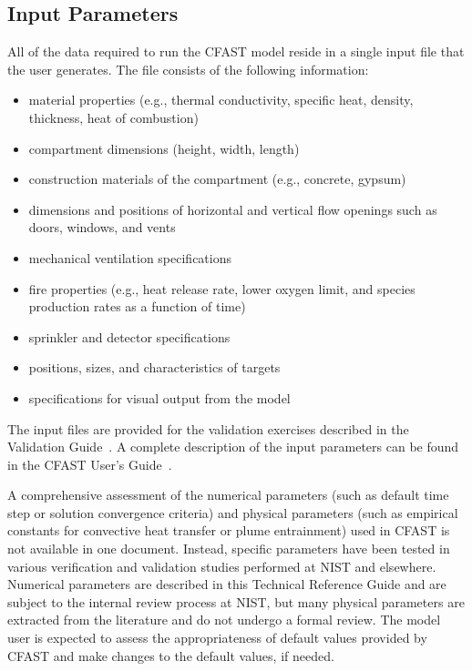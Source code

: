 \documentclass[11pt]{book}
\begin{document}
\subsection{Input Parameters}

All of the data required to run the CFAST model reside in a single input file that the user generates. The file consists of the following information:
\begin{itemize}
\item material properties (e.g., thermal conductivity, specific heat, density, thickness, heat of combustion)
\item compartment dimensions (height, width, length)
\item construction materials of the compartment (e.g., concrete, gypsum)
\item dimensions and positions of horizontal and vertical flow openings such as doors, windows, and vents
\item mechanical ventilation specifications
\item fire properties (e.g., heat release rate, lower oxygen limit, and species production rates as a function of time)
\item sprinkler and detector specifications
\item positions, sizes, and characteristics of targets
\item specifications for visual output from the model
\end{itemize}
The input files are provided for the validation exercises described in the Validation Guide~\cite{CFAST_Valid_Guide_7}. A complete description of the input parameters can be found in the CFAST User's Guide~\cite{CFAST_Users_Guide_7}.

A comprehensive assessment of the numerical parameters (such as default time step or solution convergence criteria) and physical parameters (such as empirical constants for convective heat transfer or plume entrainment) used in CFAST is not available in one document. Instead, specific parameters have been tested in various verification and validation studies performed at NIST and elsewhere. Numerical parameters are described in this Technical Reference Guide and are subject to the internal review process at NIST, but many physical parameters are extracted from the literature and do not undergo a formal review. The model user is expected to assess the appropriateness of default values provided by CFAST and make changes to the default values, if needed.
\end{document}
